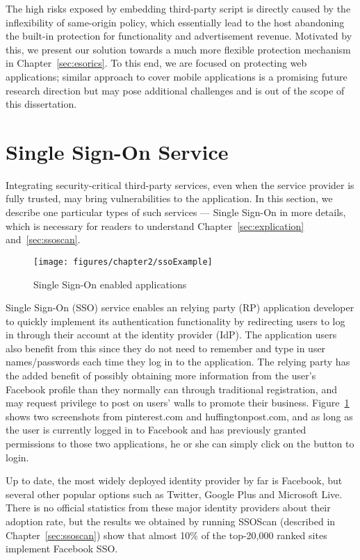 The high risks exposed by embedding third-party script is directly caused by the inflexibility of same-origin policy, which essentially lead to the host abandoning the built-in protection for functionality and advertisement revenue.  Motivated by this, we present our solution towards a much more flexible protection mechanism in Chapter~\ref{sec:esorics}.  To this end, we are focused on protecting web applications; similar approach to cover mobile applications is a promising future research direction but may pose additional challenges and is out of the scope of this dissertation.

\section{Single Sign-On Service}

Integrating security-critical third-party services, even when the service provider is fully trusted, may bring vulnerabilities to the application.  In this section, we describe one particular types of such services --- Single Sign-On in more details, which is necessary for readers to understand Chapter~\ref{sec:explication} and~\ref{sec:ssoscan}.

\begin{figure}[bth]
\centering
\texttt{[image: figures/chapter2/ssoExample]}
\caption{Single Sign-On enabled applications}
\label{fig:ssoExample}
\end{figure}

Single Sign-On (SSO) service enables an relying party (RP) application developer to quickly implement its authentication functionality by redirecting users to log in through their account at the identity provider (IdP).  The application users also benefit from this since they do not need to remember and type in user names/passwords each time they log in to the application.  The relying party has the added benefit of possibly obtaining more information from the user's Facebook profile than they normally can through traditional registration, and may request privilege to post on users' walls to promote their business.  Figure~\ref{fig:ssoExample} shows two screenshots from pinterest.com and huffingtonpost.com, and as long as the user is currently logged in to Facebook and has previously granted permissions to those two applications, he or she can simply click on the button to login.  

Up to date, the most widely deployed identity provider by far is Facebook, but several other popular options such as Twitter, Google Plus and Microsoft Live.  There is no official statistics from these major identity providers about their adoption rate, but the results we obtained by running SSOScan (described in Chapter~\ref{sec:ssoscan}) show that almost 10\% of the top-20,000 ranked sites implement Facebook SSO.

